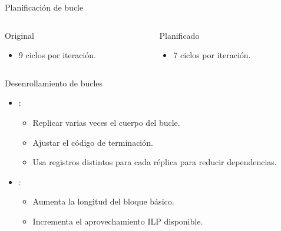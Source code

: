 \begin{frame}[t]{Planificación de bucle}

\begin{columns}[T]

\begin{column}{.45\textwidth}
\begin{block}{Original}

\end{block}

\begin{itemize}
  \item 9 ciclos por iteración.
\end{itemize}
\end{column}

\pause
\begin{column}{.45\textwidth}
\begin{block}{Planificado}

\end{block}
\begin{itemize}
  \item 7 ciclos por iteración.
\end{itemize}
\end{column}

\end{columns}
\end{frame}

\begin{frame}[t]{Desenrollamiento de bucles}
\begin{itemize}
  \item {}:
    \begin{itemize}
      \item Replicar varias veces el cuerpo del bucle.
      \item Ajustar el código de terminación.
      \item Usa registros distintos para cada réplica para reducir dependencias.
    \end{itemize}

  \item {}:
    \begin{itemize}
      \item Aumenta la longitud del bloque básico.
      \item Incrementa el aprovechamiento ILP disponible.
    \end{itemize}
\end{itemize}
\end{frame}

